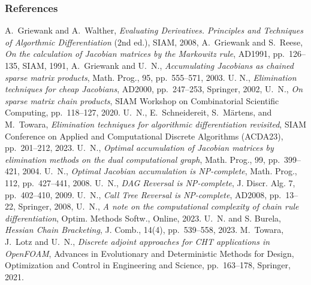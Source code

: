 \documentclass[ucs,10pt]{beamer}
\begin{document}
\begin{frame}[allowframebreaks]
\frametitle{References}
\footnotesize
\begin{thebibliography}{10}
	{\sc A.~Griewank and A.~Walther}, {\em Evaluating Derivatives. Principles and Techniques of Algorthmic Differentiation} (2nd ed.), SIAM, 2008,
{\sc A.~Griewank and S.~Reese}, {\em On the calculation of {J}acobian matrices
  by the {M}arkowitz rule}, AD1991, pp.~126--135, SIAM, 1991,
{\sc A.~Griewank and U.~N.}, {\em Accumulating {J}acobians as chained
  sparse matrix products}, Math. Prog., 95, pp.~555--571, 2003.
{\sc U. N.}, {\em Elimination techniques for cheap Jacobians}, AD2000, pp.~247--253, Springer, 2002,
		{\sc U.~N.}, {\em On sparse matrix chain products},
 SIAM Workshop on Combinatorial Scientific Computing, pp.~118--127, 2020.
{\sc U.~N., E.~Schneidereit, S.~Märtens, and M.~Towara}, {\em Elimination
  techniques for algorithmic differentiation revisited}, SIAM Conference on
  Applied and Computational Discrete Algorithms (ACDA23), pp.~201--212, 2023.
{\sc U.~N.}, {\em Optimal accumulation of {J}acobian matrices by
  elimination methods on the dual computational graph}, Math. Prog., 99, 
  pp.~399--421, 2004.
{\sc U.~N.}, {\em Optimal {J}acobian accumulation is {NP}-complete}, Math.
  Prog., 112, pp.~427--441, 2008.
{\sc U.~N.}, {\em {DAG} Reversal is {NP}-complete}, J. Discr. Alg.
  7, pp.~402--410, 2009.
{\sc U.~N.}, {\em Call Tree Reversal is {NP}-complete},  AD2008, pp.~13--22, Springer, 2008,
{\sc U.~N.}, {\em A note on the computational complexity of chain rule
  differentiation}, Optim. Methods Softw., Online, 2023.
	{\sc U.~N. and S. Burela}, {\em Hessian Chain Bracketing}, J. Comb., 14(4), pp.~539--558, 2023.
	{\sc M.~Towara, J.~Lotz and U.~N.}, {\em Discrete adjoint approaches for CHT applications in OpenFOAM}, Advances in Evolutionary and Deterministic Methods for Design, Optimization and Control in Engineering and Science, pp.~163--178, Springer, 2021.
\end{thebibliography}
\end{frame}
\end{document}

